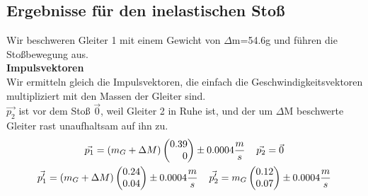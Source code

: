 \documentclass{article}
\begin{document}
\subsection{Ergebnisse für den inelastischen Stoß}
Wir beschweren Gleiter 1 mit einem Gewicht von $\Delta$m=54.6g und führen die Stoßbewegung aus. \\
\textbf{Impulsvektoren}\\
Wir ermitteln gleich die Impulsvektoren, die einfach die Geschwindigkeitsvektoren multipliziert mit den Massen der Gleiter sind. \\
$\vec{p_2}$ ist vor dem Stoß $\vec{0}$, weil Gleiter 2 in Ruhe ist, und der um $\Delta$M beschwerte Gleiter rast unaufhaltsam auf ihn zu.
\begin{gather*}
\vec{p_1}=(m_G+\Delta M)
\begin{pmatrix*}[r]
0.39 \\ 0
\end{pmatrix*}\pm 0.0004 \frac{m}{s} \hspace{0.4cm}
\vec{p_2}=\vec{0} \\
\vec{p_1'}=
(m_G+\Delta M)\begin{pmatrix*}[r]
0.24 \\ 0.04
\end{pmatrix*} \pm 0.0004  \frac{m}{s}\hspace{0.4cm}
\vec{p_2'}=m_G\begin{pmatrix*}[r]
0.12 \\ 0.07
\end{pmatrix*} \pm 0.0004  \frac{m}{s}
\end{gather*}
\end{document}
